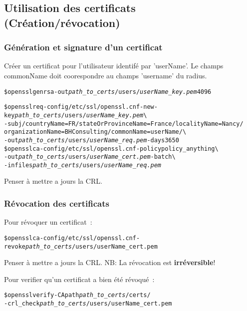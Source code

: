 \subsection{Utilisation des certificats (Création/révocation)}
\subsubsection{Génération et signature d'un certificat}
Créer un certificat pour l'utilisateur identifé par 'userName'. Le champs commonName doit coorespondre au champs 'username' du radius.
\begin{alltt}
\$ openssl genrsa -out \emph{path\_to\_certs}/users/\emph{userName\_key.pem} 4096

\$ openssl req -config /etc/ssl/openssl.cnf -new -key \emph{path\_to\_certs}/users/\emph{userName\_key.pem} \textbackslash\\
        -subj /countryName=FR/stateOrProvinceName=France/localityName=Nancy/\\organizationName=BHConsulting/commonName=userName/ \textbackslash\\
	-out \emph{path\_to\_certs}/users/\emph{userName\_req.pem} -days 3650\\

\$ openssl ca -config /etc/ssl/openssl.cnf -policy policy\_anything \textbackslash\\
	-out \emph{path\_to\_certs}/users/\emph{userName\_cert.pem} -batch \textbackslash\\
	-infiles \emph{path\_to\_certs}/users/\emph{userName\_req.pem}
\end{alltt}
Penser à mettre a jours la CRL.



\subsubsection{Révocation des certificats}
Pour révoquer un certificat~: 
\begin{alltt}

\$ openssl ca -config /etc/ssl/openssl.cnf -revoke \emph{path\_to\_certs}/users/userName\_cert.pem

\end{alltt}

Penser à mettre a jours la CRL.
NB: La révocation est \textbf{irréversible}!

Pour verifier qu'un certificat a bien été révoqué~:
\begin{alltt}

\$ openssl verify  -CApath \emph{path\_to\_certs}/certs/ \\-crl\_check \emph{path\_to\_certs}/users/userName\_cert.pem

\end{alltt}

